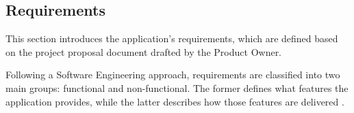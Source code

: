 \subsection{Requirements}
\label{sec:requirements}

This section introduces the application's requirements, which are defined based on the project proposal document drafted by the Product Owner.

Following a Software Engineering approach, requirements are classified into two main groups: functional and non-functional. The former defines what features the application provides, while the latter describes how those features are delivered \cite{functional-and-non-functional-requirements}. 




